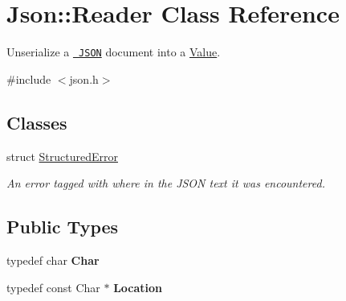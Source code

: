 \hypertarget{class_json_1_1_reader}{}\section{Json\+::Reader Class Reference}
\label{class_json_1_1_reader}


Unserialize a \href{http://www.json.org}{\texttt{ J\+S\+ON}} document into a \mbox{\hyperlink{class_json_1_1_value}{Value}}.  




{\ttfamily \#include $<$json.\+h$>$}

\subsection*{Classes}
\begin{DoxyCompactItemize}
\item 
struct \mbox{\hyperlink{struct_json_1_1_reader_1_1_structured_error}{Structured\+Error}}
\begin{DoxyCompactList}\small\item\em An error tagged with where in the J\+S\+ON text it was encountered. \end{DoxyCompactList}\end{DoxyCompactItemize}
\subsection*{Public Types}
\begin{DoxyCompactItemize}
\item 
\mbox{\label{class_json_1_1_reader_a3eec9118f3e9a672ba8348c3a79d0f45}} 
typedef char {\bfseries Char}
\item 
\mbox{\label{class_json_1_1_reader_a46795b5b272bf79a7730e406cb96375a}} 
typedef const Char $\ast$ {\bfseries Location}
\end{DoxyCompactItemize}

